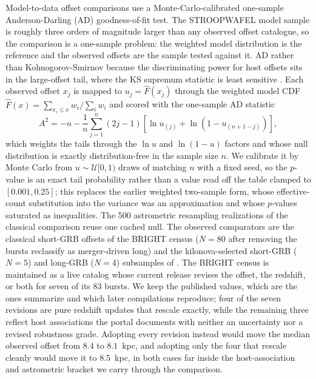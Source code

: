\documentclass[twocolumn,apj]{openjournal}
\begin{document}
Model-to-data offset comparisons use a Monte-Carlo-calibrated one-sample
Anderson-Darling (AD) goodness-of-fit test. The STROOPWAFEL model sample is
roughly three orders of magnitude larger than any observed offset catalogue, so
the comparison is a one-sample problem: the weighted model distribution is the
reference and the observed offsets are the sample tested against it. AD rather
than Kolmogorov-Smirnov because the discriminating power for host offsets sits
in the large-offset tail, where the KS supremum statistic is least sensitive
\citep[the same choice made by][]{skobe2026}. Each observed offset $x_j$ is
mapped to $u_j = \hat{F}(x_j)$ through the weighted model CDF
$\hat{F}(x) = \sum_{x_i \leq x} w_i / \sum_i w_i$ and scored with the one-sample
AD statistic
\begin{equation}
A^2 = -n - \frac{1}{n} \sum_{j=1}^{n} (2j - 1)
\left[\ln u_{(j)} + \ln\!\left(1 - u_{(n+1-j)}\right)\right],
\label{eq:wad}
\end{equation}
which weights the tails through the $\ln u$ and $\ln(1-u)$ factors and whose
null distribution is exactly distribution-free in the sample size $n$. We
calibrate it by Monte Carlo from $u \sim \mathcal{U}[0,1)$ draws of matching $n$
with a fixed seed, so the $p$-value is an exact tail probability rather than a
value read off the \citet{scholz1987} table clamped to $[0.001, 0.25]$; this
replaces the earlier weighted two-sample form, whose \citet{kish1965}
effective-count substitution into the \citet{scholz1987} variance was an
approximation and whose $p$-values saturated as inequalities. The 500
astrometric resampling realizations of the classical comparison reuse one cached
null. The observed comparators are the classical short-GRB offsets of the
\citet{fong2022} BRIGHT census ($N = 80$ after removing the bursts
\citet{skobe2026} reclassify as merger-driven long) and the kilonova-selected
short-GRB ($N = 5$) and long-GRB ($N = 4$) subsamples of \citet{skobe2026}.
The BRIGHT census is maintained as a live catalog whose current release revises
the offset, the redshift, or both for seven of its 83 bursts. We keep the
published values, which are the ones \citet{fong2022} summarize and which later
compilations reproduce; four of the seven revisions are pure redshift updates
that rescale exactly, while the remaining three reflect host associations the
portal documents with neither an uncertainty nor a revised robustness grade.
Adopting every revision instead would move the median observed offset from
$8.4$ to $8.1$~kpc, and adopting only the four that rescale cleanly would move
it to $8.5$~kpc, in both cases far inside the host-association and astrometric
bracket we carry through the comparison.
\end{document}
